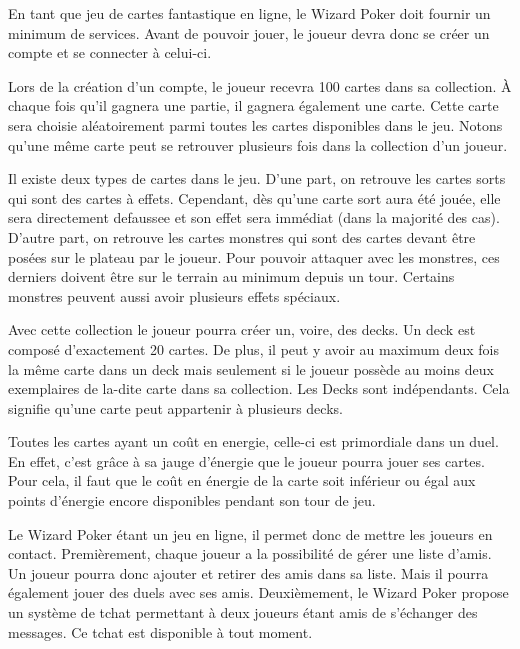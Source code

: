 \documentclass[11pt,a4paper]{article}
\begin{document}
En tant que jeu de cartes fantastique en ligne, le Wizard Poker doit fournir un minimum de services. Avant de pouvoir jouer, le joueur devra donc se créer un compte et se connecter à celui-ci.

\medbreak

Lors de la création d'un compte, le joueur recevra 100 cartes dans sa \gls{collection}.  À chaque fois qu'il gagnera une partie, il gagnera également une carte.  Cette carte sera choisie aléatoirement parmi toutes les cartes disponibles dans le jeu.  Notons qu'une même carte peut se retrouver plusieurs fois dans la \gls{collection} d'un joueur.

\medbreak
{}
Il existe deux types de \gls{carte}s dans le jeu. D'une part, on retrouve les cartes \gls{sort}s qui sont des cartes à effets. Cependant, dès qu'une carte \gls{sort} aura été jouée, elle sera directement \gls{defausse}e et son effet sera immédiat (dans la majorité des cas). D'autre part, on retrouve les cartes \gls{monstre}s qui sont des cartes devant être posées sur le plateau par le joueur. Pour pouvoir attaquer avec les monstres, ces derniers doivent être sur le terrain au minimum depuis un tour. Certains monstres peuvent aussi avoir plusieurs effets spéciaux.

\medbreak

Avec cette \gls{collection} le joueur pourra créer un, voire, des \gls{deck}s.  Un \gls{deck} est composé d'exactement 20 cartes.  De plus, il peut y avoir au maximum deux fois la même carte dans un \gls{deck} mais seulement si le joueur possède au moins deux exemplaires de la-dite carte dans sa \gls{collection}.  Les Decks sont indépendants.  Cela signifie qu'une carte peut appartenir à plusieurs decks.

\medbreak

Toutes les cartes ayant un coût en \gls{energie}, celle-ci est primordiale dans un duel. En effet, c'est grâce à sa jauge d'énergie que le joueur pourra jouer ses cartes. Pour cela, il faut que le coût en énergie de la carte soit inférieur ou égal aux points d'énergie encore disponibles pendant son tour de jeu.

\medbreak

Le Wizard Poker étant un jeu en ligne, il permet donc de mettre les joueurs en contact. Premièrement, chaque joueur a la possibilité de gérer une liste d'amis. Un joueur pourra donc ajouter et retirer des amis dans sa liste. Mais il pourra également jouer des duels avec ses amis. Deuxièmement, le Wizard Poker propose un système de \gls{tchat} permettant à deux joueurs étant amis de s'échanger des messages.  Ce tchat est disponible à tout moment.
\end{document}
